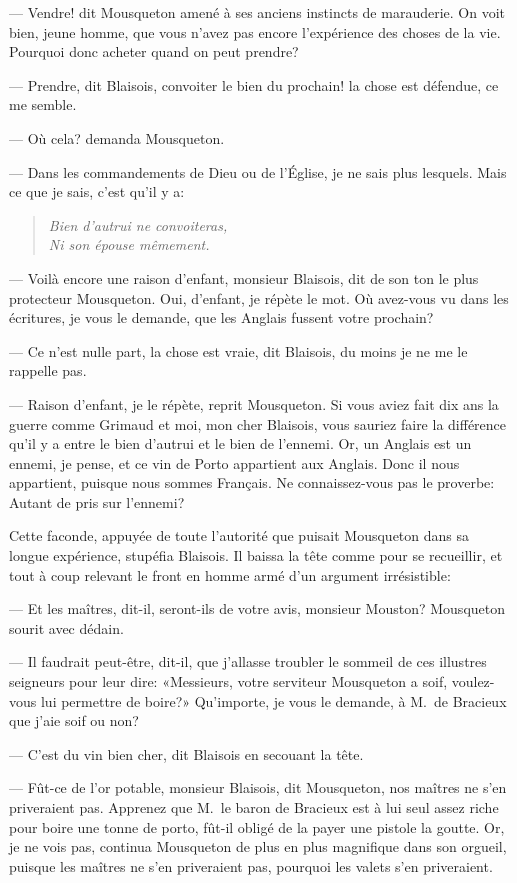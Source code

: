 — Vendre! dit Mousqueton amené à ses anciens instincts de marauderie. On voit bien, jeune homme, que vous n'avez pas encore l'expérience des choses de la vie. Pourquoi donc acheter quand on peut prendre?

— Prendre, dit Blaisois, convoiter le bien du prochain! la chose est défendue, ce me semble.

— Où cela? demanda Mousqueton.

— Dans les commandements de Dieu ou de l'Église, je ne sais plus lesquels. Mais ce que je sais, c'est qu'il y a:

\begin{verse}\itshape
	Bien d'autrui ne convoiteras,\\
Ni son épouse mêmement.\\
\end{verse}

— Voilà encore une raison d'enfant, monsieur Blaisois, dit de son ton le plus protecteur Mousqueton. Oui, d'enfant, je répète le mot. Où avez-vous vu dans les écritures, je vous le demande, que les Anglais fussent votre prochain?

— Ce n'est nulle part, la chose est vraie, dit Blaisois, du moins je ne me le rappelle pas.

— Raison d'enfant, je le répète, reprit Mousqueton. Si vous aviez fait dix ans la guerre comme Grimaud et moi, mon cher Blaisois, vous sauriez faire la différence qu'il y a entre le bien d'autrui et le bien de l'ennemi. Or, un Anglais est un ennemi, je pense, et ce vin de Porto appartient aux Anglais. Donc il nous appartient, puisque nous sommes Français. Ne connaissez-vous pas le proverbe: Autant de pris sur l'ennemi?

Cette faconde, appuyée de toute l'autorité que puisait Mousqueton dans sa longue expérience, stupéfia Blaisois. Il baissa la tête comme pour se recueillir, et tout à coup relevant le front en homme armé d'un argument irrésistible:

— Et les maîtres, dit-il, seront-ils de votre avis, monsieur Mouston?
Mousqueton sourit avec dédain.

— Il faudrait peut-être, dit-il, que j'allasse troubler le sommeil de ces illustres seigneurs pour leur dire: «Messieurs, votre serviteur Mousqueton a soif, voulez-vous lui permettre de boire?» Qu'importe, je vous le demande, à M.~de Bracieux que j'aie soif ou non?

— C'est du vin bien cher, dit Blaisois en secouant la tête.

— Fût-ce de l'or potable, monsieur Blaisois, dit Mousqueton, nos maîtres ne s'en priveraient pas. Apprenez que M.~le baron de Bracieux est à lui seul assez riche pour boire une tonne de porto, fût-il obligé de la payer une pistole la goutte. Or, je ne vois pas, continua Mousqueton de plus en plus magnifique dans son orgueil, puisque les maîtres ne s'en priveraient pas, pourquoi les valets s'en priveraient.

